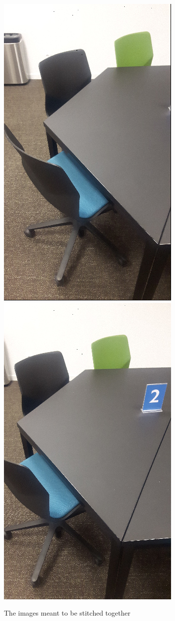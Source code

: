 \documentclass[a4paper, titlepage,12pt]{article}
\begin{document}
	\begin{figure}[H]
		\begin{center}
			\includegraphics[scale=0.5]{./to_detect_2_1.jpg}
			\includegraphics[scale=0.5]{./to_detect_2_2.jpg}
			\caption{The images meant to be stitched together}
		\end{center}
	\end{figure}
\end{document}
